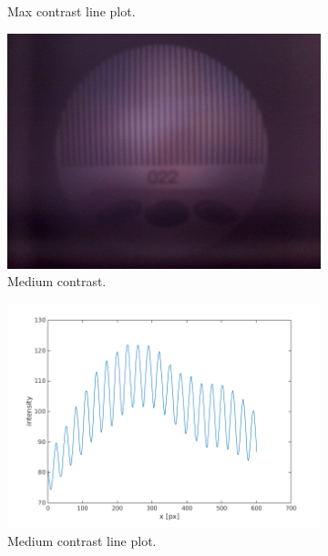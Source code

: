 \documentclass[a4paper, 12pt]{paper}
\begin{document}
\begin{figure}[H]
\begin{subfigure}[t]{0.45\textwidth}
        \caption{Max contrast line plot.}
    \end{subfigure}
    \begin{subfigure}[t]{0.40\textwidth}
        \includegraphics[width=\textwidth]{img/22}
        \caption{Medium contrast.}
    \end{subfigure}
    \begin{subfigure}[t]{0.45\textwidth}
        \includegraphics[width=\textwidth]{img/line_plot_22}
        \caption{Medium contrast line plot.}
    \end{subfigure}
    \begin{subfigure}[t]{0.40\textwidth}

\end{subfigure}
\end{figure}
\end{document}
